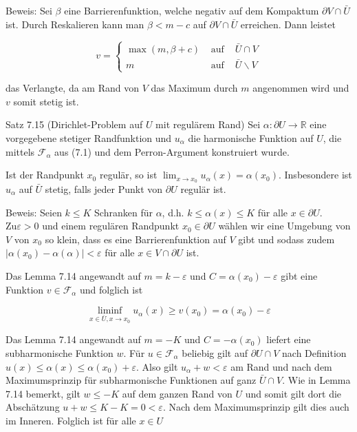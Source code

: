 \documentclass[10pt, letterpaper]{article}
\begin{document}
Beweis: Sei $\beta$ eine Barrierenfunktion, welche negativ auf dem Kompaktum $\partial V \cap \bar{U}$ ist. Durch Reskalieren kann man $\beta<m-c$ auf $\partial V \cap \bar{U}$ erreichen. Dann leistet

$$
v=\left\{\begin{array}{lll}
\max (m, \beta+c) & \text { auf } & \bar{U} \cap V \\
m & \text { auf } & \bar{U} \backslash V
\end{array}\right.
$$

das Verlangte, da am Rand von $V$ das Maximum durch $m$ angenommen wird und $v$ somit stetig ist.

Satz 7.15 (Dirichlet-Problem auf $U$ mit regulärem Rand) Sei $\alpha: \partial U \rightarrow \mathbb{R}$ eine vorgegebene stetiger Randfunktion und $u_{\alpha}$ die harmonische Funktion auf $U$, die mittels $\mathcal{F}_{\alpha}$ aus (7.1) und dem Perron-Argument konstruiert wurde.

Ist der Randpunkt $x_{0}$ regulär, so ist $\lim _{x \rightarrow x_{0}} u_{\alpha}(x)=\alpha\left(x_{0}\right)$. Insbesondere ist $u_{\alpha}$ auf $\bar{U}$ stetig, falls jeder Punkt von $\partial U$ regulär ist.

Beweis: Seien $k \leq K$ Schranken für $\alpha$, d.h. $k \leq \alpha(x) \leq K$ für alle $x \in \partial U$. $\mathrm{Zu} \varepsilon>0$ und einem regulären Randpunkt $x_{0} \in \partial U$ wählen wir eine Umgebung von $V$ von $x_{0}$ so klein, dass es eine Barrierenfunktion auf $V$ gibt und sodass zudem $\left|\alpha\left(x_{0}\right)-\alpha(\alpha)\right|<\varepsilon$ für alle $x \in V \cap \partial U$ ist.

Das Lemma 7.14 angewandt auf $m=k-\varepsilon$ und $C=\alpha\left(x_{0}\right)-\varepsilon$ gibt eine Funktion $v \in \mathcal{F}_{\alpha}$ und folglich ist

$$
\liminf _{x \in \bar{U}, x \rightarrow x_{0}} u_{\alpha}(x) \geq v\left(x_{0}\right)=\alpha\left(x_{0}\right)-\varepsilon
$$

Das Lemma 7.14 angewandt auf $m=-K$ und $C=-\alpha\left(x_{0}\right)$ liefert eine subharmonische Funktion $w$. Für $u \in \mathcal{F}_{\alpha}$ beliebig gilt auf $\partial U \cap V$ nach Definition $u(x) \leq \alpha(x) \leq \alpha\left(x_{0}\right)+\varepsilon$. Also gilt $u_{\alpha}+w<\varepsilon$ am Rand und nach dem Maximumsprinzip für subharmonische Funktionen auf ganz $\bar{U} \cap V$. Wie in Lemma 7.14 bemerkt, gilt $w \leq-K$ auf dem ganzen Rand von $U$ und somit gilt dort die Abschätzung $u+w \leq K-K=0<\varepsilon$. Nach dem Maximumsprinzip gilt dies auch im Inneren. Folglich ist für alle $x \in U$
\end{document}
